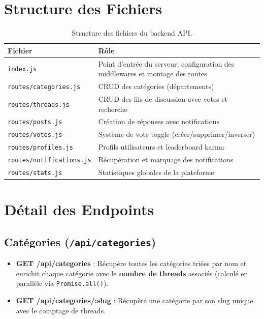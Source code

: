 \documentclass[12pt, a4paper]{report}
\begin{document}
\section{Structure des Fichiers}

\begin{table}[H]
\centering
\renewcommand{\arraystretch}{1.3}
\begin{tabularx}{\textwidth}{l X}
\toprule
\textbf{Fichier} & \textbf{Rôle} \\
\midrule
\texttt{index.js} & Point d'entrée du serveur, configuration des middlewares et montage des routes \\
\texttt{routes/categories.js} & CRUD des catégories (départements) \\
\texttt{routes/threads.js} & CRUD des fils de discussion avec votes et recherche \\
\texttt{routes/posts.js} & Création de réponses avec notifications \\
\texttt{routes/votes.js} & Système de vote toggle (créer/supprimer/inverser) \\
\texttt{routes/profiles.js} & Profils utilisateurs et leaderboard karma \\
\texttt{routes/notifications.js} & Récupération et marquage des notifications \\
\texttt{routes/stats.js} & Statistiques globales de la plateforme \\
\bottomrule
\end{tabularx}
\caption{Structure des fichiers du backend API.}
\end{table}

\section{Détail des Endpoints}

\subsection{Catégories (\texttt{/api/categories})}

\begin{itemize}
    \item \textbf{GET /api/categories} : Récupère toutes les catégories triées par nom et enrichit chaque catégorie avec le \textbf{nombre de threads} associés (calculé en parallèle via \texttt{Promise.all()}).
    \item \textbf{GET /api/categories/:slug} : Récupère une catégorie par son slug unique avec le comptage de threads.
\end{itemize}
\end{document}
